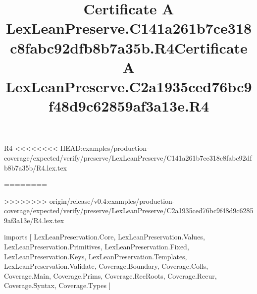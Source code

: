 \begin{lexlean}{R4}
<<<<<<<< HEAD:examples/production-coverage/expected/verify/preserve/LexLeanPreserve/C141a261b7ce318c8fabc92dfb8b7a35b/R4.lex.tex
\title{Certificate A LexLeanPreserve.C141a261b7ce318c8fabc92dfb8b7a35b.R4}
========
\title{Certificate A LexLeanPreserve.C2a1935ced76bc9f48d9c62859af3a13e.R4}
>>>>>>>> origin/release/v0.4:examples/production-coverage/expected/verify/preserve/LexLeanPreserve/C2a1935ced76bc9f48d9c62859af3a13e/R4.lex.tex
\begin{coremodule}
imports [
  LexLeanPreservation.Core,
  LexLeanPreservation.Values,
  LexLeanPreservation.Primitives,
  LexLeanPreservation.Fixed,
  LexLeanPreservation.Keys,
  LexLeanPreservation.Templates,
  LexLeanPreservation.Validate,
  Coverage.Boundary,
  Coverage.Colls,
  Coverage.Main,
  Coverage.Prims,
  Coverage.RecRoots,
  Coverage.Recur,
  Coverage.Syntax,
  Coverage.Types
]


\end{coremodule}
\end{lexlean}
